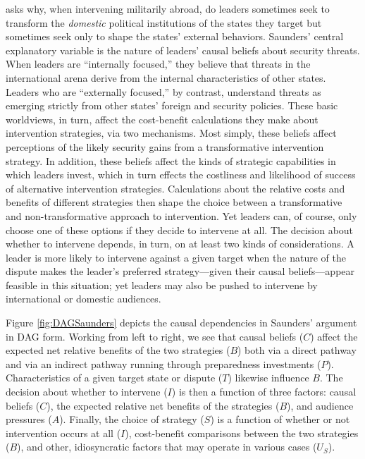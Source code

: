\documentclass[12pt,]{book}
\begin{document}
\citet{saunders2011leaders} asks why, when intervening militarily abroad, do leaders sometimes seek to transform the \emph{domestic} political institutions of the states they target but sometimes seek only to shape the states' external behaviors. Saunders' central explanatory variable is the nature of leaders' causal beliefs about security threats. When leaders are ``internally focused,'' they believe that threats in the international arena derive from the internal characteristics of other states. Leaders who are ``externally focused,'' by contrast, understand threats as emerging strictly from other states' foreign and security policies. These basic worldviews, in turn, affect the cost-benefit calculations they make about intervention strategies, via two mechanisms. Most simply, these beliefs affect perceptions of the likely security gains from a transformative intervention strategy. In addition, these beliefs affect the kinds of strategic capabilities in which leaders invest, which in turn effects the costliness and likelihood of success of alternative intervention strategies. Calculations about the relative costs and benefits of different strategies then shape the choice between a transformative and non-transformative approach to intervention. Yet leaders can, of course, only choose one of these options if they decide to intervene at all. The decision about whether to intervene depends, in turn, on at least two kinds of considerations. A leader is more likely to intervene against a given target when the nature of the dispute makes the leader's preferred strategy---given their causal beliefs---appear feasible in this situation; yet leaders may also be pushed to intervene by international or domestic audiences.

Figure \ref{fig:DAGSaunders} depicts the causal dependencies in Saunders' argument in DAG form. Working from left to right, we see that causal beliefs (\(C\)) affect the expected net relative benefits of the two strategies (\(B\)) both via a direct pathway and via an indirect pathway running through preparedness investments (\(P\)). Characteristics of a given target state or dispute (\(T\)) likewise influence \(B\). The decision about whether to intervene (\(I\)) is then a function of three factors: causal beliefs (\(C\)), the expected relative net benefits of the strategies (\(B\)), and audience pressures (\(A\)). Finally, the choice of strategy (\(S\)) is a function of whether or not intervention occurs at all (\(I\)), cost-benefit comparisons between the two strategies (\(B\)), and other, idiosyncratic factors that may operate in various cases (\(U_S\)).
\end{document}
